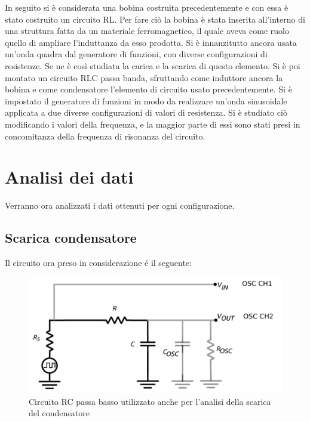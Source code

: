 \documentclass{article}
\begin{document}
In seguito si è considerata una bobina costruita precedentemente e con essa è stato costruito un circuito RL. Per fare ciò la bobina è stata inserita all'interno di una struttura fatta da un materiale ferromagnetico, il quale aveva come ruolo quello di ampliare l'induttanza da esso prodotta. Si è innanzitutto ancora usata un'onda quadra dal generatore di funzioni, con diverse configurazioni di resistenze. Se ne è così studiata la carica e la scarica di questo elemento. Si è poi montato un circuito RLC passa banda, sfruttando come induttore ancora la bobina e come condensatore l'elemento di circuito usato precedentemente. Si è impostato il generatore di funzioni in modo da realizzare un'onda sinusoidale applicata a due diverse configurazioni di valori di resistenza. Si è studiato ciò modificando i valori della frequenza, e la maggior parte di essi sono stati presi in concomitanza della frequenza di risonanza del circuito.

\newpage


\section{Analisi dei dati}

Verranno ora analizzati i dati ottenuti per ogni configurazione.

\subsection{Scarica condensatore}

Il circuito ora preso in considerazione \'e il seguente:

\begin{figure}[h]
    \centering
    \includegraphics[width = \textwidth]{RC_LP.png}
    \caption{Circuito RC passa basso utilizzato anche per l'analisi della scarica del condensatore}
    \label{fig:RC_LP}
\end{figure}
\end{document}

